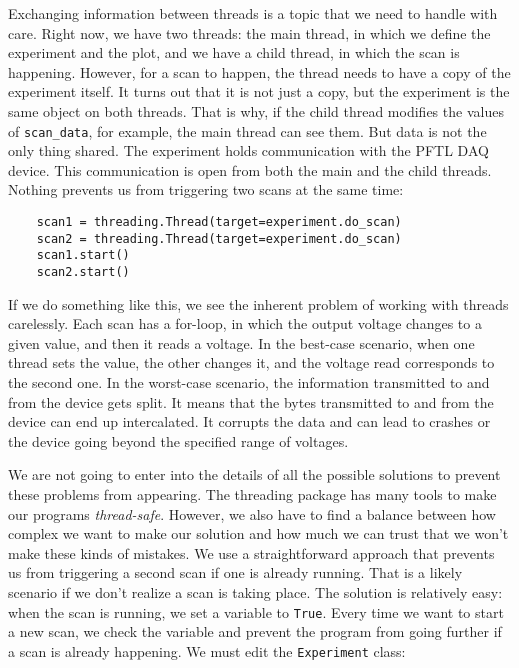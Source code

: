 Exchanging information between threads is a topic that we need to handle with care. Right now, we have two threads: the main thread, in which we define the experiment and the plot, and we have a child thread, in which the scan is happening. However, for a scan to happen, the thread needs to have a copy of the experiment itself. It turns out that it is not just a copy, but the experiment is the same object on both threads. That is why, if the child thread modifies the values of \texttt{scan\_data}, for example, the main thread can see them. But data is not the only thing shared. The experiment holds communication with the {PFTL DAQ} device. This communication is open from both the main and the child threads. Nothing prevents us from triggering two scans at the same time:

\begin{verbatim}
    scan1 = threading.Thread(target=experiment.do_scan)
    scan2 = threading.Thread(target=experiment.do_scan)
    scan1.start()
    scan2.start()
\end{verbatim}

If we do something like this, we see the inherent problem of working with threads carelessly. Each scan has a for-loop, in which the output voltage changes to a given value, and then it reads a voltage. In the best-case scenario, when one thread sets the value, the other changes it, and the voltage read corresponds to the second one. In the worst-case scenario, the information transmitted to and from the device gets split. It means that the bytes transmitted to and from the device can end up intercalated. It corrupts the data and can lead to crashes or the device going beyond the specified range of voltages.

We are not going to enter into the details of all the possible solutions to prevent these problems from appearing. The threading package has many tools to make our programs \emph{thread-safe}. However, we also have to find a balance between how complex we want to make our solution and how much we can trust that we won't make these kinds of mistakes. We use a straightforward approach that prevents us from triggering a second scan if one is already running. That is a likely scenario if we don't realize a scan is taking place. The solution is relatively easy: when the scan is running, we set a variable to \texttt{True}. Every time we want to start a new scan, we check the variable and prevent the program from going further if a scan is already happening. We must edit the \texttt{Experiment} class:

